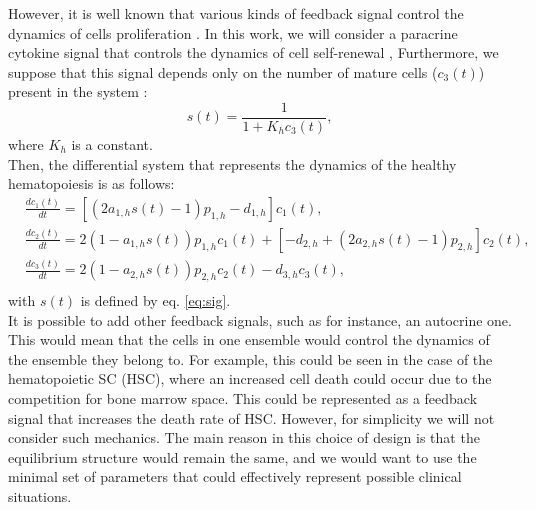 \documentclass[a4paper,10pt]{article}
\begin{document}

However, it is well known that various kinds of feedback signal 
control the dynamics of cells proliferation 
\cite{layton1989evidence, metcalf2008hematopoietic, fried2009erythropoietin}.
In this work, we will consider a paracrine cytokine signal that 
controls the dynamics of cell self-renewal \cite{czochra, marciniak2013mathematical, stiehl2012mathematical, stiehl2018mathematical}, 
Furthermore, we suppose that this signal depends only on 
the number of mature cells ($c_{3}(t)$)
present in the system \cite{czochra}:
\begin{equation}
s(t)=\frac{1}{1+K_hc_{3}(t)},
\label{eq:sig}
\end{equation}
where $K_h$ is  a constant. \\
Then, the differential system that represents the dynamics of the healthy hematopoiesis
is as follows:
\begin{equation}
\begin{array}{ll}
& \frac{dc_{1}(t)}{dt}= [(2a_{1,h}s(t)-1)p_{1,h}-d_{1,h}]c_{1}(t),\\
& \frac{dc_{2}(t)}{dt}=2(1-a_{1,h}s(t))p_{1,h}c_{1}(t) +[-d_{2,h}+(2a_{2,h}s(t)-1)p_{2,h}]c_{2}(t), \\
& \frac{dc_{3}(t)}{dt}=2(1-a_{2,h}s(t))p_{2,h}c_{2}(t)-d_{3,h}c_{3}(t), \\
\end{array}
\label{eq:sist1}
\end{equation}
with $s(t)$ is defined by eq. \eqref{eq:sig}.\\
It is possible to add other feedback signals, such as for instance, an autocrine one.
This would mean that the cells in one ensemble
would control the dynamics of the ensemble they belong to.
For example, this could be seen in the case of the hematopoietic SC (HSC),
where an increased cell death could occur due
to  the competition for bone marrow space.
This could be represented as a feedback signal that increases
\cite{griffin1986clonogenic,calvi2003osteoblastic,zhang2003identification, garrido2001acute} 
the death rate of HSC. However, for simplicity
we will not consider such mechanics.
The main reason in this choice of design is that the equilibrium 
structure would remain the same, and
we would want to use the minimal set of parameters 
that could effectively represent possible clinical situations.\\
\end{document}
